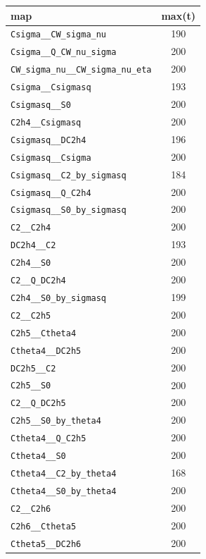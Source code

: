 \begin{table}\begin{tabular}{|l|c|}\hline
map & max(t)\\\hline
\texttt{Csigma\_\_CW\_sigma\_nu} & 190\\\hline
\texttt{Csigma\_\_Q\_CW\_nu\_sigma} & 200\\\hline
\texttt{CW\_sigma\_nu\_\_CW\_sigma\_nu\_eta} & 200\\\hline
\texttt{Csigma\_\_Csigmasq} & 193\\\hline
\texttt{Csigmasq\_\_S0} & 200\\\hline
\texttt{C2h4\_\_Csigmasq} & 200\\\hline
\texttt{Csigmasq\_\_DC2h4} & 196\\\hline
\texttt{Csigmasq\_\_Csigma} & 200\\\hline
\texttt{Csigmasq\_\_C2\_by\_sigmasq} & 184\\\hline
\texttt{Csigmasq\_\_Q\_C2h4} & 200\\\hline
\texttt{Csigmasq\_\_S0\_by\_sigmasq} & 200\\\hline
\texttt{C2\_\_C2h4} & 200\\\hline
\texttt{DC2h4\_\_C2} & 193\\\hline
\texttt{C2h4\_\_S0} & 200\\\hline
\texttt{C2\_\_Q\_DC2h4} & 200\\\hline
\texttt{C2h4\_\_S0\_by\_sigmasq} & 199\\\hline
\texttt{C2\_\_C2h5} & 200\\\hline
\texttt{C2h5\_\_Ctheta4} & 200\\\hline
\texttt{Ctheta4\_\_DC2h5} & 200\\\hline
\texttt{DC2h5\_\_C2} & 200\\\hline
\texttt{C2h5\_\_S0} & 200\\\hline
\texttt{C2\_\_Q\_DC2h5} & 200\\\hline
\texttt{C2h5\_\_S0\_by\_theta4} & 200\\\hline
\texttt{Ctheta4\_\_Q\_C2h5} & 200\\\hline
\texttt{Ctheta4\_\_S0} & 200\\\hline
\texttt{Ctheta4\_\_C2\_by\_theta4} & 168\\\hline
\texttt{Ctheta4\_\_S0\_by\_theta4} & 200\\\hline
\texttt{C2\_\_C2h6} & 200\\\hline
\texttt{C2h6\_\_Ctheta5} & 200\\\hline
\texttt{Ctheta5\_\_DC2h6} & 200\\\hline

\end{tabular}
\end{table}
